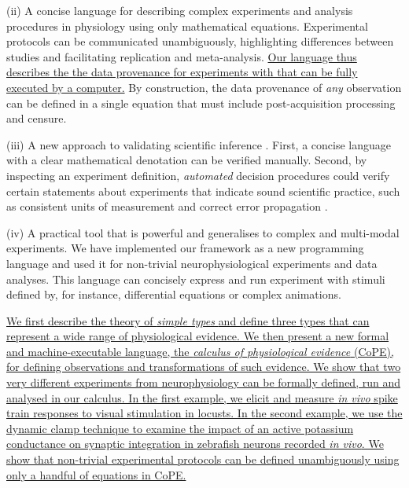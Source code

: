 (ii) A concise language for describing complex experiments and
analysis procedures in physiology using only mathematical
equations. Experimental protocols can be communicated unambiguously,
highlighting differences between studies and facilitating replication
and meta-analysis. \underline{Our language thus describes the the data
  provenance \cite{Pool2002,MacKenzie-Graham2008, VanHorn2009} for
  experiments with that can be fully executed by a computer.} By
construction, the data provenance \cite{Pool2002,MacKenzie-Graham2008,
  VanHorn2009} of \emph{any} observation can be defined in a single
equation that must include post-acquisition processing and censure.

(iii) A new approach to validating scientific inference
\cite{Editors2003, Editors2010}. First, a concise language with a
clear mathematical denotation can be verified manually. Second, by
inspecting an experiment definition, \emph{automated} decision procedures
could verify certain statements about experiments that indicate sound
scientific practice, such as consistent units of measurement
\cite{Kennedy1997} and correct error propagation \cite{Taylor1997}.

(iv) A practical tool that is powerful and generalises to complex and
multi-modal experiments. We have implemented our framework as a new
programming language and used it for non-trivial neurophysiological
experiments and data analyses. This language can concisely express and
run experiment with stimuli defined by, for instance, differential
equations or complex animations.

\underline{We first describe the theory of \emph{simple types} \cite{Pierce2002,
  Hindley2008} and define three types that can represent a wide range
of physiological evidence. We then present a new formal and
machine-executable language, the \emph{calculus of physiological
  evidence} (CoPE), for defining observations and transformations of
such evidence. We show that two very different experiments
  from neurophysiology can be formally defined, run and analysed in
  our calculus. In the first example, we elicit and measure \emph{in
    vivo} spike train responses to visual stimulation in locusts. In
  the second example, we use the dynamic clamp technique to examine
  the impact of an active potassium conductance on synaptic
  integration in zebrafish neurons recorded \emph{in vivo}. We show
that non-trivial experimental protocols can be defined unambiguously
using only a handful of equations in CoPE.}


